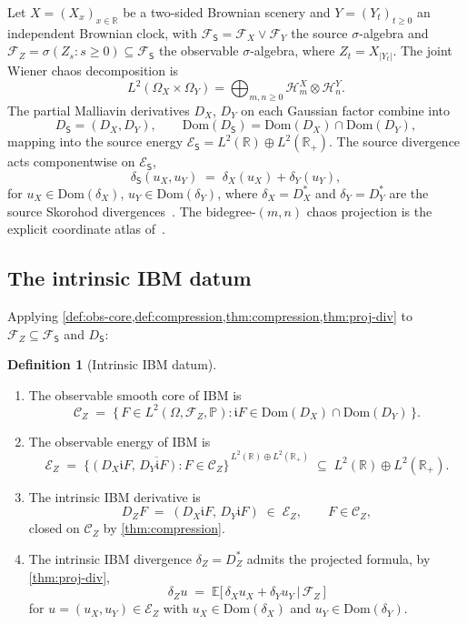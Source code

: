 \documentclass[11pt,reqno]{amsart}
\theoremstyle{plain}
\theoremstyle{definition}
\newtheorem{definition}[theorem]{Definition}
\theoremstyle{remark}
\newcommand{\R}{\mathbb{R}}
\newcommand{\E}{\mathbb{E}}
\newcommand{\Prob}{\mathbb{P}}
\newcommand{\Hilb}{\mathcal{H}}
\newcommand{\Dom}{\mathrm{Dom}}
\newcommand{\Energy}{\mathcal{E}}
\newcommand{\Source}{\mathsf{S}}
\renewcommand{\iota}{\mathfrak{i}}
\newcommand{\IBM}{Z}
\begin{document}
Let $X=(X_x)_{x\in\R}$ be a two-sided Brownian scenery and
$Y=(Y_t)_{t\ge 0}$ an independent Brownian clock, with
$\mathcal F_\Source=\mathcal F_X\vee\mathcal F_Y$ the source
$\sigma$-algebra and
$\mathcal F_\IBM=\sigma(\IBM_s:s\ge 0)\subseteq\mathcal F_\Source$
the observable $\sigma$-algebra, where $\IBM_t=X_{|Y_t|}$. The joint
Wiener chaos decomposition is
\[
  L^2(\Omega_X\times\Omega_Y)
  =\bigoplus_{m,n\ge 0}\Hilb^{X}_{m}\otimes\Hilb^{Y}_{n}.
\]
The partial Malliavin derivatives $D_X$, $D_Y$ on each Gaussian factor
combine into
\[
  D_\Source=(D_X,D_Y),\qquad
  \Dom(D_\Source)=\Dom(D_X)\cap\Dom(D_Y),
\]
mapping into the source energy
$\Energy_\Source=L^2(\R)\oplus L^2(\R_+)$. The source divergence acts
componentwise on $\Energy_\Source$,
\begin{equation}\label{eq:delta-S}
  \delta_\Source(u_X,u_Y) \;=\; \delta_X(u_X)+\delta_Y(u_Y),
\end{equation}
for $u_X\in\Dom(\delta_X)$, $u_Y\in\Dom(\delta_Y)$, where
$\delta_X=D_X^{*}$ and $\delta_Y=D_Y^{*}$ are the source Skorohod
divergences~\cite{Nualart,Janson}. The bidegree-$(m,n)$ chaos projection
is the explicit coordinate atlas of~\cite{Fontes-IBMchaos}.

\subsection*{The intrinsic IBM datum}

Applying \cref{def:obs-core,def:compression,thm:compression,thm:proj-div}
to $\mathcal F_\IBM\subseteq\mathcal F_\Source$ and $D_\Source$:

\begin{definition}[Intrinsic IBM datum]\label{def:ibm-datum}
\hfill
\begin{enumerate}
\item The observable smooth core of IBM is
\[
  \mathcal C_\IBM
  \;=\;\bigl\{\,F\in L^{2}(\Omega,\mathcal F_\IBM,\Prob):
        \iota F\in\Dom(D_X)\cap\Dom(D_Y)\,\bigr\}.
\]
\item The observable energy of IBM is
\[
  \Energy_\IBM
  \;=\;\overline{\bigl\{(D_X\iota F,\,D_Y\iota F):F\in\mathcal C_\IBM\bigr\}}
       ^{\,L^{2}(\R)\oplus L^{2}(\R_{+})}
  \;\subseteq\; L^{2}(\R)\oplus L^{2}(\R_{+}).
\]
\item The intrinsic IBM derivative is
\[
  D_\IBM F \;=\; (D_X\iota F,\,D_Y\iota F) \;\in\;\Energy_\IBM,
  \qquad F\in\mathcal C_\IBM,
\]
closed on $\mathcal C_\IBM$ by \cref{thm:compression}.
\item The intrinsic IBM divergence $\delta_\IBM=D_\IBM^{*}$ admits the
projected formula, by \cref{thm:proj-div},
\begin{equation}\label{eq:ibm-delta}
  \delta_\IBM u \;=\; \E\!\bigl[\,\delta_X u_X+\delta_Y u_Y\,\big|\,
   \mathcal F_\IBM\,\bigr]
\end{equation}
for $u=(u_X,u_Y)\in\Energy_\IBM$ with $u_X\in\Dom(\delta_X)$ and
$u_Y\in\Dom(\delta_Y)$.
\end{enumerate}
\end{definition}
\end{document}
